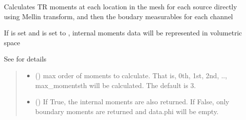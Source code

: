 \documentclass[letterpaper,10pt,english]{sphinxmanual}
\begin{document}
\begin{fulllineitems}
\begin{fulllineitems}
\end{fulllineitems}


\begin{fulllineitems}
\label{\detokenize{_autosummary/nirfasterff.base.stnd_mesh.stndmesh:nirfasterff.base.stnd_mesh.stndmesh.femdata_moments}}
\pysigstartsignatures
{}
\pysigstopsignatures
\sphinxAtStartPar
Calculates TR moments at each location in the mesh for each source directly using Mellin transform, and then the boudary measurables for each channel

\sphinxAtStartPar
If  is set and  is set to , internal moments data will be represented in volumetric space

\sphinxAtStartPar
See {\hyperref[\detokenize{_autosummary/nirfasterff.forward.femdata.femdata_stnd_TR_moments:nirfasterff.forward.femdata.femdata_stnd_TR_moments}]{}} for details
\begin{quote}\begin{description}
\begin{itemize}
\item {} 
\sphinxAtStartPar
{} (\sphinxstyleliteralemphasis{\sphinxupquote{, }}) \textendash{} max order of moments to calculate. That is, 0th, 1st, 2nd, .., max\_moments\sphinxhyphen{}th will be calculated. The default is 3.

\item {} 
\sphinxAtStartPar
{} (\sphinxstyleliteralemphasis{\sphinxupquote{, }}) \textendash{} 
\sphinxAtStartPar
If True, the internal moments are also returned. If False, only boundary moments are returned and data.phi will be empty.


\end{itemize}
\end{description}
\end{quote}
\end{fulllineitems}
\end{fulllineitems}
\end{document}

